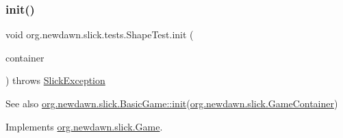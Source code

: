 \mbox{\label{classorg_1_1newdawn_1_1slick_1_1tests_1_1_shape_test_adf4c54dafed85ae929d022be9734b9ca}} 
\subsubsection{\texorpdfstring{init()}{init()}}
{\footnotesize\ttfamily void org.\+newdawn.\+slick.\+tests.\+Shape\+Test.\+init (\begin{DoxyParamCaption}\item[{\mbox{\hyperlink{classorg_1_1newdawn_1_1slick_1_1_game_container}{Game\+Container}}}]{container }\end{DoxyParamCaption}) throws \mbox{\hyperlink{classorg_1_1newdawn_1_1slick_1_1_slick_exception}{Slick\+Exception}}\hspace{0.3cm}{\ttfamily [inline]}}

\begin{DoxySeeAlso}{See also}
\mbox{\hyperlink{classorg_1_1newdawn_1_1slick_1_1_basic_game_a8af0900217e4d389249f71367b22d114}{org.\+newdawn.\+slick.\+Basic\+Game\+::init}}(\mbox{\hyperlink{classorg_1_1newdawn_1_1slick_1_1_game_container}{org.\+newdawn.\+slick.\+Game\+Container}}) 
\end{DoxySeeAlso}


Implements \mbox{\hyperlink{interfaceorg_1_1newdawn_1_1slick_1_1_game_ad2dd6affab08bb8fdb5fab0815957b7a}{org.\+newdawn.\+slick.\+Game}}.



